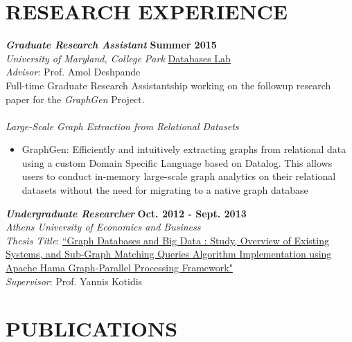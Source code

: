 \documentclass[margin, 10pt]{res} %
\begin{document}
\begin{resume}

\section{RESEARCH EXPERIENCE}

{\sl \textbf{Graduate Research Assistant}} \hfill \textbf{Summer 2015} \\
\textit{University of Maryland, College Park} \href{http://www.cs.umd.edu/~amol/DBGroup/pubs.html}{Databases Lab}\\
\textit{Advisor}: Prof. Amol Deshpande\\
Full-time Graduate Research Assistantship working on the followup research paper
for the \textit{GraphGen} Project.\\
\\
{\sl Large-Scale Graph Extraction from Relational Datasets}\\
\begin{itemize}
  \item GraphGen: Efficiently and intuitively extracting graphs from relational data using a custom Domain Specific Language based on Datalog. This allows users to conduct in-memory large-scale graph analytics on their relational datasets without the need for migrating to a native graph database
\end{itemize}

{\sl \textbf{Undergraduate Researcher}} \hfill \textbf{Oct. 2012 - Sept. 2013}\\
\textit{Athens University of Economics and Business}\\
\textit{Thesis Title}:
\href{https://drive.google.com/open?id=0B20MIwp_I7FlVFlNVWtQb3VXTmM}{``Graph Databases and Big Data : Study, Overview of Existing Systems, and Sub-Graph Matching Queries Algorithm Implementation using Apache Hama Graph-Parallel Processing Framework"}\\
\textit{Supervisor}: Prof. Yannis Kotidis


\section{PUBLICATIONS }


\end{resume}
\end{document}
